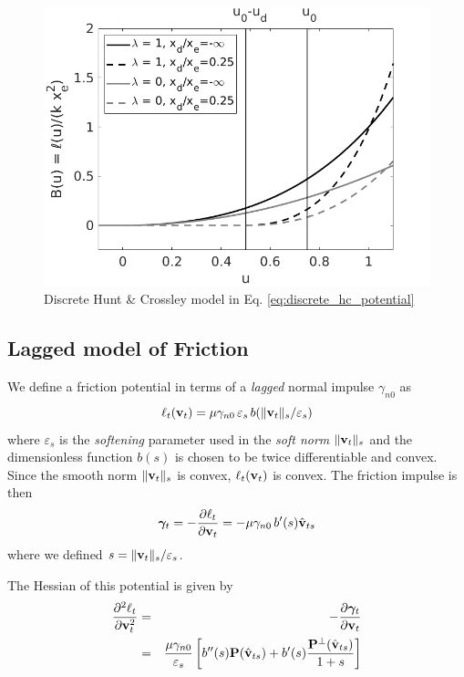 \begin{figure}[!h]
    \centering
    \includegraphics[width=0.8\columnwidth]{figures/discrete_hc_potential.png}
    \caption{Discrete Hunt \& Crossley model in Eq. \eqref{eq:discrete_hc_potential}}
    \label{fig:discrete_hc_potential}
\end{figure}


\subsection{Lagged model of Friction}

We define a friction potential in terms of a \emph{lagged} normal impulse $\gamma_{n0}$ as
\begin{equation}
    \ell_t({\mathbf{v}}_t) = \mu\gamma_{n0}\,\varepsilon_s\,b(\Vert{\mathbf{v}}_t\Vert_s/\varepsilon_s)
\end{equation}
where $\varepsilon_s$ is the \emph{softening} parameter used in the \emph{soft norm} $\Vert{\mathbf{v}}_t\Vert_s$ and the dimensionless function $b(s)$ is chosen to be twice differentiable and convex. Since the smooth norm $\Vert{\mathbf{v}}_t\Vert_s$ is convex, $\ell_t({\mathbf{v}}_t)$ is convex. The friction impulse is then
\begin{equation}
    {\bm\gamma}_t = -\frac{\partial\ell_t}{\partial{\mathbf{v}}_t}=-\mu\gamma_{n0}\,b'(s)\hat{{\mathbf{v}}}_{ts}
\end{equation}
where we defined $s=\Vert{\mathbf{v}}_t\Vert_s/\varepsilon_s$.

The Hessian of this potential is given by
\begin{eqnarray}
    \frac{\partial^2\ell_t}{\partial{\mathbf{v}}_t^2}&=&-\frac{\partial{\bm\gamma}_t}{\partial{\mathbf{v}}_t}\nonumber\\
    &=&\frac{\mu\gamma_{n0}}{\varepsilon_s}\left[b''(s){\mathbf{P}}(\hat{{\mathbf{v}}}_{ts})+b'(s)\frac{{\mathbf{P}}^\perp(\hat{{\mathbf{v}}}_{ts})}{1+s}\right]
\end{eqnarray}

